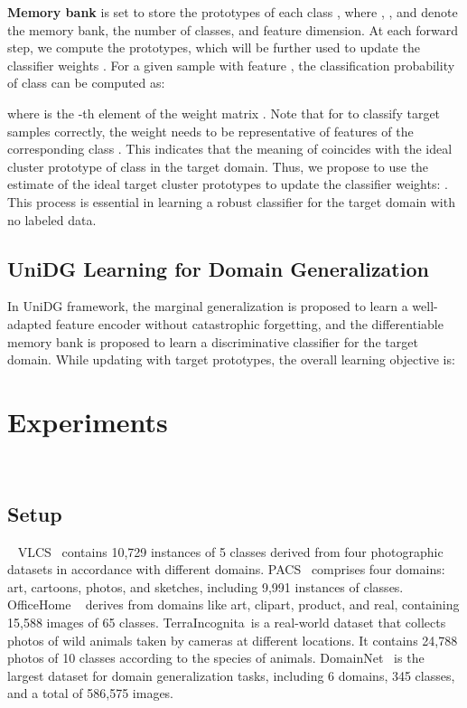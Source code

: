 \documentclass{article} \usepackage{iclr2024_conference,times}
\begin{document}
    \textbf{Memory bank} is set to store the prototypes of each class , where , , and  denote the memory bank, the number of classes, and feature dimension. At each forward step, we compute the prototypes, which will be further used to update the classifier weights . For a given sample  with feature , the classification probability of class  can be computed as:
    
    where  is the -th element of the weight matrix . Note that for  to classify target samples correctly, the weight  needs to be representative of features of the corresponding class . This indicates that the meaning of  coincides with the ideal cluster prototype of class  in the target domain. Thus, we propose to use the estimate of the ideal target cluster prototypes  to update the classifier weights: . This process is essential in learning a robust classifier for the target domain with no labeled data. 
    
\subsection{UniDG Learning for Domain Generalization}
In UniDG framework, the marginal generalization is proposed to learn a well-adapted feature encoder without catastrophic forgetting, and the differentiable memory bank is proposed to learn a discriminative classifier for the target domain. 
While updating  with target prototypes, the overall learning objective is: 





\section{Experiments} ~\label{sec:exp}
\subsection{Setup} ~\label{sec:exp:setup}
\textbf{} 
VLCS~\citep{torralba2011unbiased} contains 10,729 instances of 5 classes derived from four photographic datasets in accordance with different domains. PACS~\citep{li2017deeper} comprises four domains: art, cartoons, photos, and sketches, including 9,991 instances of classes. OfficeHome ~\citep{venkateswara2017deep} derives from domains like art, clipart, product, and real, containing 15,588 images of 65 classes. TerraIncognita~\citep{beery2018recognition}is a real-world dataset that collects photos of wild animals taken by cameras at different locations. It contains 24,788 photos of 10 classes according to the species of animals. DomainNet~\citep{peng2019moment} is the largest dataset for domain generalization tasks, including 6 domains, 345 classes, and a total of 586,575 images. \par
\end{document}
